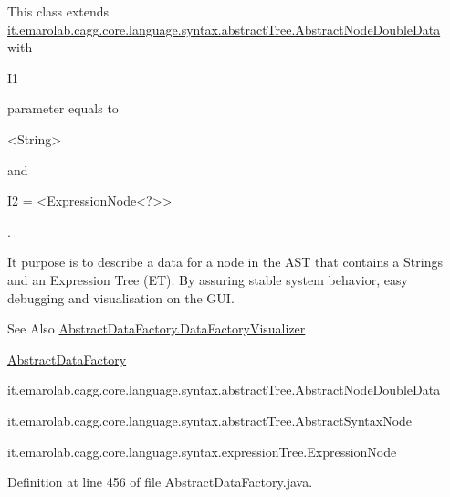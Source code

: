 This class extends \hyperlink{}{it.\-emarolab.\-cagg.\-core.\-language.\-syntax.\-abstract\-Tree.\-Abstract\-Node\-Double\-Data} with
\begin{DoxyCode}
I1 
\end{DoxyCode}
 parameter equals to
\begin{DoxyCode}
<String> 
\end{DoxyCode}
 and
\begin{DoxyCode}
I2 = <ExpressionNode<?>> 
\end{DoxyCode}
 .\par
 It purpose is to describe a data for a node in the A\-S\-T that contains a Strings and an Expression Tree (E\-T). By assuring stable system behavior, easy debugging and visualisation on the G\-U\-I. 

\begin{DoxySeeAlso}{See Also}
\hyperlink{classit_1_1emarolab_1_1cagg_1_1core_1_1language_1_1syntax_1_1abstractTree_1_1AbstractDataFactory_1_1DataFactoryVisualizer}{Abstract\-Data\-Factory.\-Data\-Factory\-Visualizer} 

\hyperlink{classit_1_1emarolab_1_1cagg_1_1core_1_1language_1_1syntax_1_1abstractTree_1_1AbstractDataFactory}{Abstract\-Data\-Factory} 

it.\-emarolab.\-cagg.\-core.\-language.\-syntax.\-abstract\-Tree.\-Abstract\-Node\-Double\-Data 

it.\-emarolab.\-cagg.\-core.\-language.\-syntax.\-abstract\-Tree.\-Abstract\-Syntax\-Node 

it.\-emarolab.\-cagg.\-core.\-language.\-syntax.\-expression\-Tree.\-Expression\-Node 
\end{DoxySeeAlso}


Definition at line 456 of file Abstract\-Data\-Factory.\-java.



